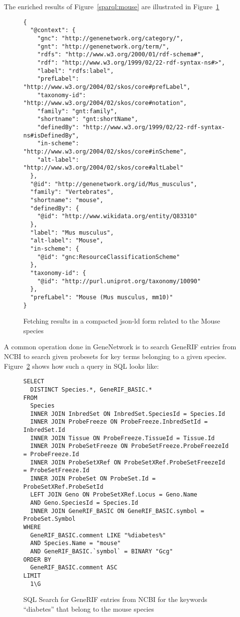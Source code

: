 The enriched results of Figure~\ref{sparql:mouse} are illustrated in Figure~\ref{figure:mouse-sparql-results}

\begin{figure}[H]
\centering
\begin{verbatim}
{
  "@context": {
    "gnc": "http://genenetwork.org/category/",
    "gnt": "http://genenetwork.org/term/",
    "rdfs": "http://www.w3.org/2000/01/rdf-schema#",
    "rdf": "http://www.w3.org/1999/02/22-rdf-syntax-ns#>",
    "label": "rdfs:label",
    "prefLabel": "http://www.w3.org/2004/02/skos/core#prefLabel",
    "taxonomy-id": "http://www.w3.org/2004/02/skos/core#notation",
    "family": "gnt:family",
    "shortname": "gnt:shortName",
    "definedBy": "http://www.w3.org/1999/02/22-rdf-syntax-ns#isDefinedBy",
    "in-scheme": "http://www.w3.org/2004/02/skos/core#inScheme",
    "alt-label": "http://www.w3.org/2004/02/skos/core#altLabel"
  },
  "@id": "http://genenetwork.org/id/Mus_musculus",
  "family": "Vertebrates",
  "shortname": "mouse",
  "definedBy": {
    "@id": "http://www.wikidata.org/entity/Q83310"
  },
  "label": "Mus musculus",
  "alt-label": "Mouse",
  "in-scheme": {
    "@id": "gnc:ResourceClassificationScheme"
  },
  "taxonomy-id": {
    "@id": "http://purl.uniprot.org/taxonomy/10090"
  },
  "prefLabel": "Mouse (Mus musculus, mm10)"
}
\end{verbatim}
\caption{Fetching results in a compacted json-ld form related to the Mouse species}\label{figure:mouse-sparql-results}
\end{figure}

A common operation done in GeneNetwork is to search GeneRIF entries from NCBI to search given probesets for key terms belonging to a given species.   Figure~\ref{sql:search-ncbi} shows how such a query in SQL looks like:

\begin{figure}[H]
\centering
\begin{verbatim}
SELECT 
  DISTINCT Species.*, GeneRIF_BASIC.* 
FROM 
  Species
  INNER JOIN InbredSet ON InbredSet.SpeciesId = Species.Id 
  INNER JOIN ProbeFreeze ON ProbeFreeze.InbredSetId = InbredSet.Id 
  INNER JOIN Tissue ON ProbeFreeze.TissueId = Tissue.Id 
  INNER JOIN ProbeSetFreeze ON ProbeSetFreeze.ProbeFreezeId = ProbeFreeze.Id 
  INNER JOIN ProbeSetXRef ON ProbeSetXRef.ProbeSetFreezeId = ProbeSetFreeze.Id 
  INNER JOIN ProbeSet ON ProbeSet.Id = ProbeSetXRef.ProbeSetId 
  LEFT JOIN Geno ON ProbeSetXRef.Locus = Geno.Name 
  AND Geno.SpeciesId = Species.Id
  INNER JOIN GeneRIF_BASIC ON GeneRIF_BASIC.symbol = ProbeSet.Symbol 
WHERE 
  GeneRIF_BASIC.comment LIKE "%diabetes%" 
  AND Species.Name = "mouse"
  AND GeneRIF_BASIC.`symbol` = BINARY "Gcg"
ORDER BY 
  GeneRIF_BASIC.comment ASC
LIMIT 
  1\G
\end{verbatim}
\caption{SQL Search for GeneRIF entries from NCBI for the keywords ``diabetes'' that belong to the mouse species}\label{sql:search-ncbi}
\end{figure}


